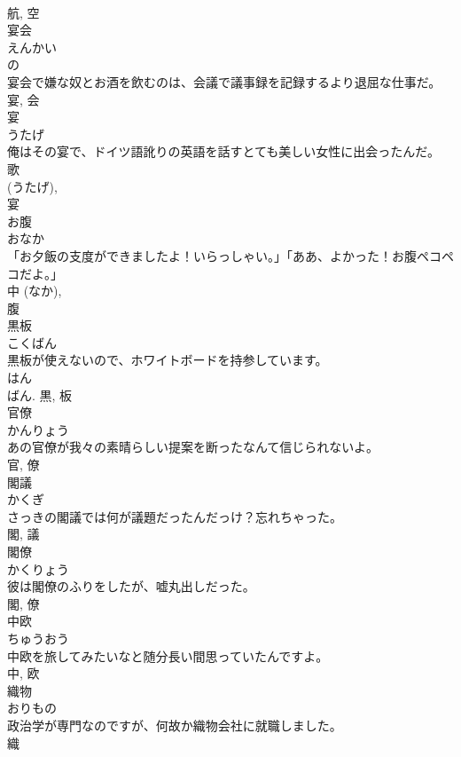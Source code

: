 \documentclass[8pt]{extreport}
\begin{document}
\begin{CJK}{UTF8}{min}
\\	航, 空	
\\	宴会	
\\	えんかい	
\\	の 
\\	宴会で嫌な奴とお酒を飲むのは、会議で議事録を記録するより退屈な仕事だ。	
\\	宴, 会	
\\	宴	
\\	うたげ	
\\	俺はその宴で、ドイツ語訛りの英語を話すとても美しい女性に出会ったんだ。	
\\	歌 
\\	(うたげ), 
\\	宴	
\\	お腹	
\\	おなか	
\\	「お夕飯の支度ができましたよ！いらっしゃい。」「ああ、よかった！お腹ペコペコだよ。」	
\\	中 (なか), 
\\	腹	
\\	黒板	
\\	こくばん	
\\	黒板が使えないので、ホワイトボードを持参しています。	
\\	はん 
\\	ばん.	黒, 板	
\\	官僚	
\\	かんりょう	
\\	あの官僚が我々の素晴らしい提案を断ったなんて信じられないよ。	
\\	官, 僚	
\\	閣議	
\\	かくぎ	
\\	さっきの閣議では何が議題だったんだっけ？忘れちゃった。	
\\	閣, 議	
\\	閣僚	
\\	かくりょう	
\\	彼は閣僚のふりをしたが、嘘丸出しだった。	
\\	閣, 僚	
\\	中欧	
\\	ちゅうおう	
\\	中欧を旅してみたいなと随分長い間思っていたんですよ。	
\\	中, 欧	
\\	織物	
\\	おりもの	
\\	政治学が専門なのですが、何故か織物会社に就職しました。	
\\	織 

\end{CJK}
\end{document}
